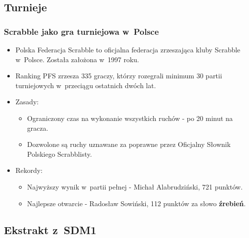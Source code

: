 \documentclass[10pt,a4paper]{beamer}
\begin{document}
\subsection{Turnieje}

\begin{frame}
	\frametitle{Scrabble jako gra turniejowa w~Polsce}

	\begin{itemize}
		\item Polska Federacja Scrabble to oficjalna federacja zrzeszająca kluby Scrabble w~Polsce. Została założona w~1997 roku.
		\item Ranking PFS zrzesza 335 graczy, którzy rozegrali minimum 30 partii turniejowych w~przeciągu ostatnich dwóch lat.
		\item Zasady:
			\begin{itemize}
				\item Ograniczony czas na wykonanie wszystkich ruchów - po 20 minut na gracza.
				\item Dozwolone są ruchy uznawane za poprawne przez Oficjalny Słownik Polskiego Scrabblisty.
			\end{itemize}
		\item Rekordy:
			\begin{itemize}
				\item Najwyższy wynik w~partii pełnej - Michał Alabrudziński, 721 punktów.
				\item Najlepsze otwarcie - Radosław Sowiński, 112 punktów za słowo \textbf{źrebień}.
			\end{itemize}
	\end{itemize}
	
\end{frame}

\subsection{Ekstrakt z~SDM1}
\end{document}
